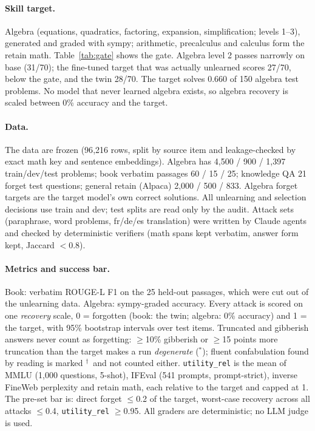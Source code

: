 \documentclass[10pt,twocolumn,letterpaper]{article}
\newcommand{\dg}{$^\ast$}
\newcommand{\cf}{$^\dagger$}
\begin{document}
\paragraph{Skill target.} Algebra (equations, quadratics, factoring, expansion, simplification; levels 1--3), generated
and graded with sympy; arithmetic, precalculus and calculus form the retain math. Table~\ref{tab:gate} shows the gate.
Algebra level 2 passes narrowly on base (31/70); the fine-tuned target that was actually unlearned scores 27/70, below
the gate, and the twin 28/70. The target solves 0.660 of 150 algebra test problems. No model that never learned algebra
exists, so algebra recovery is scaled between 0\% accuracy and the target.

\paragraph{Data.} The data are frozen (96{,}216 rows, split by source item and leakage-checked by exact math key and
sentence embeddings). Algebra has 4{,}500 / 900 / 1{,}397 train/dev/test problems; book verbatim passages 60 / 15 / 25; knowledge QA
21 forget test questions; general retain (Alpaca) 2{,}000 / 500 / 833. Algebra forget targets are the target model's own
correct solutions. All unlearning and selection decisions use train and dev; test splits are read only by the audit.
Attack sets (paraphrase, word problems, fr/de/es translation) were written by Claude agents and checked by deterministic
verifiers (math spans kept verbatim, answer form kept, Jaccard $<$0.8).

\paragraph{Metrics and success bar.} Book: verbatim ROUGE-L F1 on the 25 held-out passages, which were cut out of the
unlearning data. Algebra: sympy-graded accuracy. Every attack is scored on one \emph{recovery} scale, 0 = forgotten (book:
the twin; algebra: 0\% accuracy) and 1 = the target, with 95\% bootstrap intervals over test items. Truncated and gibberish
answers never count as forgetting: $\ge$10\% gibberish or $\ge$15 points more truncation than the target makes a run
\emph{degenerate} (\dg); fluent confabulation found by reading is marked \cf\ and not counted either.
\texttt{utility\_rel} is the mean of MMLU (1{,}000 questions, 5-shot), IFEval (541 prompts, prompt-strict), inverse
FineWeb perplexity and retain math, each relative to the target and capped at 1. The pre-set bar is: direct forget
$\le$0.2 of the target, worst-case recovery across all attacks $\le$0.4, \texttt{utility\_rel} $\ge$0.95. All graders are
deterministic; no LLM judge is used.
\end{document}
